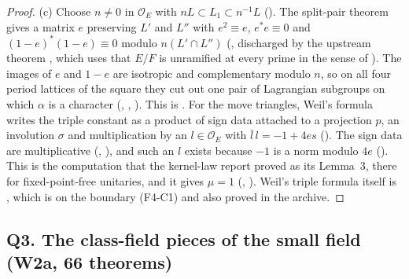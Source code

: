 \documentclass[11pt]{article}
\newcommand{\OEr}{\mathcal O_E}
\theoremstyle{remark}
\begin{document}
\begin{proof}
(c) Choose $n\neq0$ in $\OEr$ with $nL\subset L_1\subset n^{-1}L$ (). The split-pair theorem gives a matrix $e$ preserving $L'$ and $L''$ with $e^2\equiv e$, $e^*e\equiv0$ and $(1-e)^*(1-e)\equiv0$ modulo $n(L'\cap L'')$ (, discharged by the upstream theorem , which uses that $E/F$ is unramified at every prime in the sense of ). The images of $e$ and $1-e$ are isotropic and complementary modulo $n$, so on all four period lattices of the square they cut out one pair of Lagrangian subgroups on which $\alpha$ is a character (, , ). This is . For the move triangles, Weil's formula writes the triple constant as a product of sign data attached to a projection $p$, an involution $\sigma$ and multiplication by an $l\in\OEr$ with $\bar l\,l=-1+4es$ (). The sign data are multiplicative (, ), and such an $l$ exists because $-1$ is a norm modulo $4e$ (). This is the computation that the kernel-law report proved as its Lemma~3, there for fixed-point-free unitaries, and it gives $\mu=1$ (, ). Weil's triple formula itself is , which is on the boundary (F4-C1) and also proved in the archive.
\end{proof}

\subsection{Q3. The class-field pieces of the small field (W2a, 66 theorems)}
\end{document}
